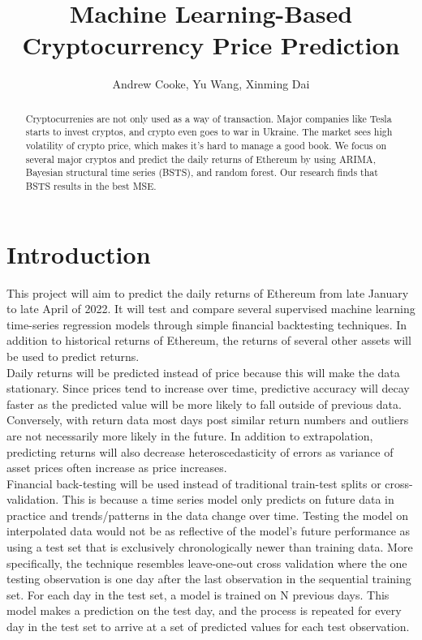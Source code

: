 \documentclass{article}
\title{Machine Learning-Based Cryptocurrency Price Prediction} %
\author{Andrew Cooke, Yu Wang, Xinming Dai}
\begin{document}
\maketitle
\begin{abstract}
Cryptocurrenies are not only used as a way of transaction. Major companies like Tesla starts to invest cryptos, and crypto even goes to war in Ukraine. The market sees high volatility of crypto price, which makes it’s hard to manage a good book. We focus on several major cryptos and predict the daily returns of Ethereum by using ARIMA, Bayesian structural time series (BSTS), and random forest. Our research finds that BSTS results in the best MSE.
\end{abstract}\hspace{10pt}

\tableofcontents


\newpage

\section{Introduction}

\noindent This project will aim to predict the daily returns of Ethereum from late January to late April of 2022. It will test and compare several supervised machine learning time-series regression models through simple financial backtesting techniques. In addition to historical returns of Ethereum, the returns of several other assets will be used to predict returns. \\

\noindent Daily returns will be predicted instead of price because this will make the data stationary. Since prices tend to increase over time, predictive accuracy will decay faster as the predicted value will be more likely to fall outside of previous data. Conversely, with return data most days post similar return numbers and outliers are not necessarily more likely in the future. In addition to extrapolation, predicting returns will also decrease heteroscedasticity of errors as variance of asset prices often increase as price increases. \\

\noindent Financial back-testing will be used instead of traditional train-test splits or cross-validation. This is because a time series model only predicts on future data in practice and trends/patterns in the data change over time. Testing the model on interpolated data would not be as reflective of the model’s future performance as using a test set that is exclusively chronologically newer than training data. More specifically, the technique resembles leave-one-out cross validation where the one testing observation is one day after the last observation in the sequential training set. For each day in the test set, a model is trained on N previous days. This model makes a prediction on the test day, and the process is repeated for every day in the test set to arrive at a set of predicted values for each test observation. \\
\end{document}
